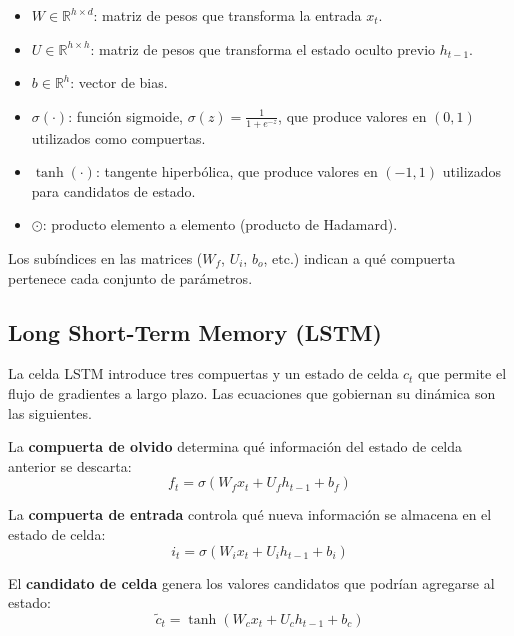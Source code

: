 \begin{itemize}
    \item $W \in \mathbb{R}^{h \times d}$: matriz de pesos que transforma la entrada $x_t$.
    \item $U \in \mathbb{R}^{h \times h}$: matriz de pesos que transforma el estado oculto previo $h_{t-1}$.
    \item $b \in \mathbb{R}^h$: vector de bias.
    \item $\sigma(\cdot)$: función sigmoide, $\sigma(z) = \frac{1}{1 + e^{-z}}$, que produce valores en $(0, 1)$ utilizados como compuertas.
    \item $\tanh(\cdot)$: tangente hiperbólica, que produce valores en $(-1, 1)$ utilizados para candidatos de estado.
    \item $\odot$: producto elemento a elemento (producto de Hadamard).
\end{itemize}

Los subíndices en las matrices ($W_f$, $U_i$, $b_o$, etc.) indican a qué compuerta pertenece cada conjunto de parámetros.

\subsection{Long Short-Term Memory (LSTM)}

La celda LSTM \cite{hochreiter1997} introduce tres compuertas y un estado de celda $c_t$ que permite el flujo de gradientes a largo plazo. Las ecuaciones que gobiernan su dinámica son las siguientes.

La \textbf{compuerta de olvido} determina qué información del estado de celda anterior se descarta:
\begin{equation}
    f_t = \sigma(W_f x_t + U_f h_{t-1} + b_f)
    \label{eq:lstm_forget}
\end{equation}

La \textbf{compuerta de entrada} controla qué nueva información se almacena en el estado de celda:
\begin{equation}
    i_t = \sigma(W_i x_t + U_i h_{t-1} + b_i)
    \label{eq:lstm_input}
\end{equation}

El \textbf{candidato de celda} genera los valores candidatos que podrían agregarse al estado:
\begin{equation}
    \tilde{c}_t = \tanh(W_c x_t + U_c h_{t-1} + b_c)
    \label{eq:lstm_candidate}
\end{equation}

